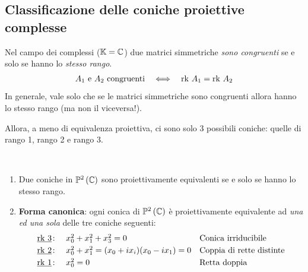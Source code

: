 \subsection{Classificazione delle coniche proiettive complesse}
\begin{remember}
Nel campo dei complessi ($\mathbb{K}=\mathbb{C}$) due matrici simmetriche \textit{sono congruenti} se e solo se hanno lo \textit{stesso rango}.
\begin{equation*}
	\begin{array}{ccc}
		A_1\text{ e }A_2\text{ congruenti}& \iff & \mathrm{rk}\  A_1=\mathrm{rk}\  A_2
	\end{array}
\end{equation*}
In generale, vale solo che se le matrici simmetriche sono congruenti allora hanno lo stesso rango (ma non il viceversa!).
\end{remember}
Allora, a meno di equivalenza proiettiva, ci sono solo 3 possibili coniche: quelle di rango 1, rango 2 e rango 3.
\begin{theorema}~{}
\begin{enumerate}
\item	Due coniche in $\proj[2]{\complexset}$ sono proiettivamente equivalenti se e solo se hanno lo stesso rango.
\item	\textbf{Forma canonica}: ogni conica di $\proj[2]{\complexset}$ è proiettivamente equivalente ad \textit{una ed una sola} delle tre coniche seguenti:\\
\begin{equation*}
		\begin{array}{cll}
		\underline{\mathrm{rk}\  3}\colon & x_0^2+x_1^2+x_3^2=0 &	\text{Conica irriducibile}\\[1mm]
		\underline{\mathrm{rk}\  2} \colon & x_0^2+x_1^2=(x_0+ix_i)(x_0-ix_1)=0 & \text{Coppia di rette distinte}\\[1mm]
		\underline{\mathrm{rk}\  1} \colon & x_0^2=0 & \text{Retta doppia}
	\end{array}
\end{equation*}
\end{enumerate}
\vspace{-3mm}
\end{theorema}
